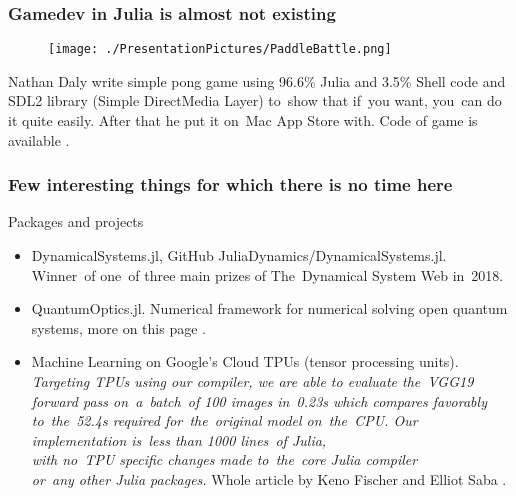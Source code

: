 \documentclass[10pt,t]{beamer}
\begin{document}
\begin{frame}
  \frametitle{Gamedev in Julia is almost not existing}


  \begin{figure}

    \centering

    \texttt{[image: ./PresentationPictures/PaddleBattle.png]}

  \end{figure}


  Nathan Daly write simple pong game using 96.6\% Julia and 3.5\%
  Shell code and SDL2 library (Simple DirectMedia Layer) to~show that
  if~you want, you~can do it quite easily. After that he put it on~Mac
  App Store with. Code of game is available
  .

\end{frame}





\begin{frame}
  \frametitle{Few interesting things for which there is no time
    here}


  Packages and projects

  \begin{itemize}

  \item DynamicalSystems.jl, GitHub
    {JuliaDynamics/DynamicalSystems.jl}.
    Winner~of one~of three main prizes of The~Dynamical System Web
    in~2018.

  \item QuantumOptics.jl. Numerical framework for numerical
    solving open quantum systems, more on this page
    .

  \item Machine Learning on Google's Cloud TPUs (tensor processing
    units). \\
    \textit{Targeting TPUs using our compiler, we are able to
      evaluate the~VGG19 forward pass on~a~batch~of 100 images
      in~0.23s which compares favorably to~the~52.4s required
      for~the~original model on~the~CPU. Our implementation is~less
      than 1000 lines~of Julia, \\
      with no~TPU specific changes made to~the~core Julia compiler \\
      or~any other Julia packages.} Whole article by Keno Fischer
    and Elliot Saba
    .

  \end{itemize}

\end{frame}
\end{document}
